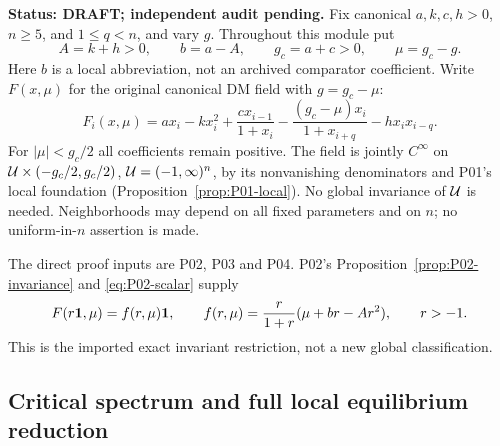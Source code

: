 \noindent\textbf{Status: DRAFT; independent audit pending.}
Fix canonical $a,k,c,h>0$, $n\ge5$, and $1\le q<n$, and vary $g$.
Throughout this module put
\begin{equation}
 A=k+h>0,\qquad b=a-A,\qquad g_c=a+c>0,\qquad \mu=g_c-g.
 \label{eq:P09-parameters}
\end{equation}
Here $b$ is a local abbreviation, not an archived comparator coefficient.
Write $F(x,\mu)$ for the original canonical DM field with $g=g_c-\mu$:
\begin{equation}
 F_i(x,\mu)=a x_i-kx_i^2+\frac{c x_{i-1}}{1+x_i}
 -\frac{(g_c-\mu)x_i}{1+x_{i+q}}-h x_i x_{i-q}.
 \label{eq:P09-field}
\end{equation}
For $|\mu|<g_c/2$ all coefficients remain positive. The field is jointly
$C^\infty$ on $\mathcal{U}\times(-g_c/2,g_c/2)$,
$\mathcal{U}=(-1,\infty)^n$, by its nonvanishing denominators and P01's
local foundation (Proposition~\ref{prop:P01-local}). No global invariance
of $\mathcal{U}$ is needed. Neighborhoods may depend on all fixed parameters
and on $n$; no uniform-in-$n$ assertion is made.

The direct proof inputs are P02, P03 and P04. P02's
Proposition~\ref{prop:P02-invariance} and \eqref{eq:P02-scalar} supply
\begin{equation}
 F(r\mathbf{1},\mu)=f(r,\mu)\mathbf{1},\qquad
 f(r,\mu)=\frac{r}{1+r}(\mu+br-Ar^2),\qquad r>-1.
 \label{eq:P09-scalar}
\end{equation}
This is the imported exact invariant restriction, not a new global
classification.

\subsection{Critical spectrum and full local equilibrium reduction}
\label{slot:P09-1}

